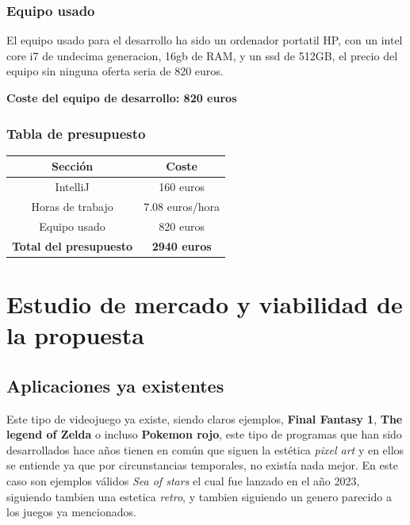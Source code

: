 \documentclass[a4paper]{article}
\begin{document}
\subsubsection{Equipo usado}
El equipo usado para el desarrollo ha sido un ordenador portatil HP, con un intel core i7 de undecima generacion, 16gb de RAM, y un ssd de 512GB, el precio del equipo sin ninguna oferta seria de 820 euros.
\begin{flushright}
    \bf Coste del equipo de desarrollo: 820 euros
\end{flushright}
\subsubsection{Tabla de presupuesto}
\begin{table}[ht]
    \centering
    \begin{tabular}{|c|c|}
        \hline
        \textbf{Sección}               & \textbf{Coste}      \\
        \hline
        IntelliJ                       & 160 euros           \\
        \hline
        Horas de trabajo               & 7.08 euros/hora     \\
        \hline
        Equipo usado                   & 820 euros           \\
        \hline
        \textbf{Total del presupuesto} & \textbf{2940 euros} \\
        \hline
    \end{tabular}
    \label{tab:presupuesto-table}
\end{table}


\clearpage
\section{Estudio de mercado y viabilidad de la propuesta}
\subsection{Aplicaciones ya existentes}
Este tipo de videojuego ya existe, siendo claros ejemplos, \textbf{Final Fantasy 1}, \textbf{The legend of Zelda} o incluso \textbf{Pokemon rojo}, este tipo de
programas que han sido desarrollados hace años tienen en común que siguen la estética \textit{pixel art} y en ellos se entiende ya que por circunstancias temporales,
no existía nada mejor. En este caso son ejemplos válidos \textit{Sea of stars} el cual fue lanzado en el año 2023, siguiendo tambien una estetica \textit{retro}, y tambien siguiendo
un genero parecido a los juegos ya mencionados.
\end{document}
